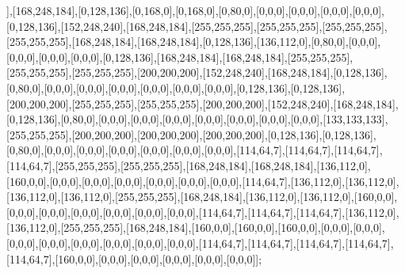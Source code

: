 ],[168,248,184],[0,128,136],[0,168,0],[0,168,0],[0,80,0],[0,0,0],[0,0,0],[0,0,0],[0,0,0],[0,128,136],[152,248,240],[168,248,184],[255,255,255],[255,255,255],[255,255,255],[255,255,255],[168,248,184],[168,248,184],[0,128,136],[136,112,0],[0,80,0],[0,0,0],[0,0,0],[0,0,0],[0,0,0],[0,128,136],[168,248,184],[168,248,184],[255,255,255],[255,255,255],[255,255,255],[200,200,200],[152,248,240],[168,248,184],[0,128,136],[0,80,0],[0,0,0],[0,0,0],[0,0,0],[0,0,0],[0,0,0],[0,0,0],[0,128,136],[0,128,136],[200,200,200],[255,255,255],[255,255,255],[200,200,200],[152,248,240],[168,248,184],[0,128,136],[0,80,0],[0,0,0],[0,0,0],[0,0,0],[0,0,0],[0,0,0],[0,0,0],[0,0,0],[133,133,133],[255,255,255],[200,200,200],[200,200,200],[200,200,200],[0,128,136],[0,128,136],[0,80,0],[0,0,0],[0,0,0],[0,0,0],[0,0,0],[0,0,0],[0,0,0],[114,64,7],[114,64,7],[114,64,7],[114,64,7],[255,255,255],[255,255,255],[168,248,184],[168,248,184],[136,112,0],[160,0,0],[0,0,0],[0,0,0],[0,0,0],[0,0,0],[0,0,0],[0,0,0],[114,64,7],[136,112,0],[136,112,0],[136,112,0],[136,112,0],[255,255,255],[168,248,184],[136,112,0],[136,112,0],[160,0,0],[0,0,0],[0,0,0],[0,0,0],[0,0,0],[0,0,0],[0,0,0],[114,64,7],[114,64,7],[114,64,7],[136,112,0],[136,112,0],[255,255,255],[168,248,184],[160,0,0],[160,0,0],[160,0,0],[0,0,0],[0,0,0],[0,0,0],[0,0,0],[0,0,0],[0,0,0],[0,0,0],[0,0,0],[114,64,7],[114,64,7],[114,64,7],[114,64,7],[114,64,7],[160,0,0],[0,0,0],[0,0,0],[0,0,0],[0,0,0],[0,0,0]];


